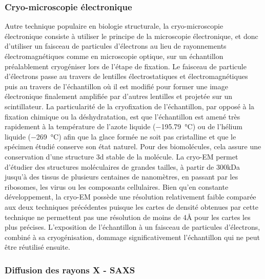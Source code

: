 \subsubsection{Cryo-microscopie électronique}

Autre technique populaire en biologie structurale, la cryo-microscopie électronique consiste à utiliser le principe de la microscopie électronique, et donc d'utiliser un faisceau de particules d'électrons au lieu de rayonnements électromagnétiques comme en microscopie optique, sur un échantillon préalablement cryogéniser lors de l'étape de fixation. Le faisceau de particule d'électrons passe au travers de lentilles électrostatiques et électromagnétiques puis au travers de l'échantillon où il est modifié pour former une image électronique finalement amplifiée par d'autres lentilles et projetée sur un scintillateur. 
La particularité de la cryofixation de l'échantillon, par opposé à la fixation chimique ou la déshydratation, est que l'échantillon est amené très rapidement à la température de l'azote liquide (\SI{-195.79}{\degreeCelsius}) ou de l'hélium liquide (\SI{-269}{\degreeCelsius}) afin que la glace formée ne soit pas cristalline et que le spécimen étudié conserve son état naturel. Pour des biomolécules, cela assure une conservation d'une structure 3d stable de la molécule. La cryo-EM permet d'étudier des structures moléculaires de grandes tailles, à partir de 300kDa jusqu'à des tissus de plusieurs centaines de nanomètres, en passant par les ribosomes, les virus ou les composants cellulaires.
Bien qu'en constante développement, la cryo-EM possède une résolution relativement faible comparée aux deux techniques précédentes puisque les cartes de densité obtenues par cette technique ne permettent pas une résolution de moins de 4\r{A} pour les cartes les plus précises\cite{zhou_atomic_2011}. L'exposition de l'échantillon à un faisceau de particules d'électrons, combiné à sa cryogénisation, dommage significativement l'échantillon qui ne peut être réutilisé ensuite.

\subsubsection{Diffusion des rayons X - SAXS}

